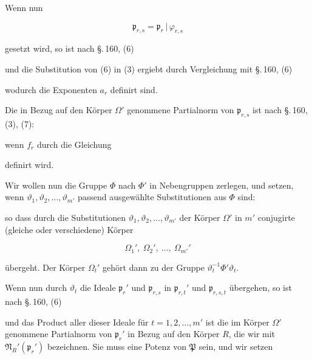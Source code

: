 Wenn nun

\[
\mathfrak{p}_{r,s} = \mathfrak{p}_r\,|\,\varphi_{r,s}
\]

gesetzt wird, so ist nach \S.\,160, (6)


und die Substitution von (6) in (3) ergiebt durch Vergleichung
mit \S.\,160, (6)


wodurch die Exponenten $a_r$ definirt sind.

Die in Bezug auf den Körper $\Omega'$ genommene Partialnorm
von $\mathfrak{p}_{r,s}$ ist nach \S.\,160, (3), (7):


wenn $f_r$ durch die Gleichung


definirt wird.

Wir wollen nun die Gruppe $\Phi$ nach $\Phi'$ in Nebengruppen zerlegen,
und setzen, wenn $\vartheta_1, \vartheta_2, \ldots, \vartheta_{m'}$ passend ausgewählte
Substitutionen aus $\Phi$ sind:


so dass durch die Substitutionen $\vartheta_1, \vartheta_2, \ldots, \vartheta_{m'}$ der Körper
$\Omega'$ in $m'$ conjugirte (gleiche oder verschiedene) Körper

\[
\Omega_1', \ \Omega_2', \ \ldots, \ \Omega_{m'}'
\]

übergeht. Der Körper $\Omega_t'$ gehört dann zu der Gruppe $\vartheta_t^{-1}\Phi'\vartheta_t$.

Wenn nun durch $\vartheta_t$ die Ideale $\mathfrak{p}_r'$ und $\mathfrak{p}_{r,s}$ in $\mathfrak{p}_{r,t}'$ und
$\mathfrak{p}_{r,s,t}$ übergehen, so ist nach \S.\,160, (6)


und das Product aller dieser Ideale für $t = 1, 2, \ldots, m'$ ist die
im Körper $\Omega'$ genommene Partialnorm von $\mathfrak{p}_r'$ in Bezug auf den
Körper $R$, die wir mit $\mathfrak{N}_R'(\mathfrak{p}_r')$ bezeichnen. Sie muss eine Potenz
von $\mathfrak{P}$ sein, und wir setzen

